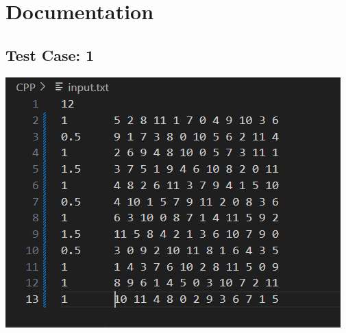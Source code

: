 \documentclass{article}
\begin{document}
\section{Documentation}
\subsection{Test Case: 1}
\includegraphics{images/testcase1.png}\\
\end{document}
